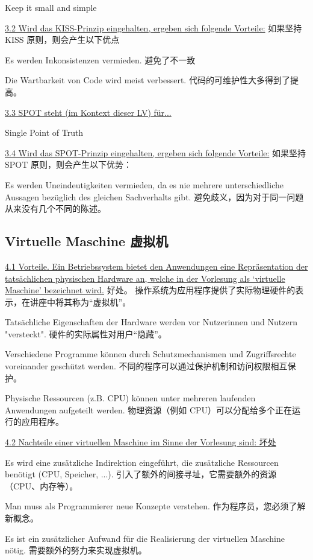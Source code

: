 \documentclass[fleqn]{article}
\begin{document}
Keep it small and simple

\noindent\uline{3.2 Wird das KISS-Prinzip eingehalten, ergeben sich folgende Vorteile:}
如果坚持 KISS 原则，则会产生以下优点

Es werden Inkonsistenzen vermieden.
避免了不一致

Die Wartbarkeit von Code wird meist verbessert. 代码的可维护性大多得到了提高。

\noindent\uline{3.3 SPOT steht (im Kontext dieser LV) für...}

Single Point of Truth

\noindent\uline{3.4 Wird das SPOT-Prinzip eingehalten, ergeben sich folgende Vorteile:}
如果坚持 SPOT 原则，则会产生以下优势：

Es werden Uneindeutigkeiten vermieden, da es nie mehrere unterschiedliche Aussagen bezüglich des gleichen Sachverhalts gibt.
避免歧义，因为对于同一问题从来没有几个不同的陈述。

\subsection{Virtuelle Maschine 虚拟机}

\noindent\uline{4.1 Vorteile. Ein Betriebssystem bietet den Anwendungen eine Repräsentation der tatsächlichen physischen Hardware an, welche in der Vorlesung als ‘virtuelle Maschine’ bezeichnet wird.}
好处。 操作系统为应用程序提供了实际物理硬件的表示，在讲座中将其称为“虚拟机”。

Tatsächliche Eigenschaften der Hardware werden vor Nutzerinnen und Nutzern "versteckt".
硬件的实际属性对用户“隐藏”。
	
Verschiedene Programme können durch Schutzmechanismen und Zugriffsrechte voreinander geschützt werden.
不同的程序可以通过保护机制和访问权限相互保护。
	
Physische Ressourcen (z.B. CPU) können unter mehreren laufenden Anwendungen aufgeteilt werden.
物理资源（例如 CPU）可以分配给多个正在运行的应用程序。

\noindent\uline{4.2 Nachteile einer virtuellen Maschine im Sinne der Vorlesung sind: 坏处}

Es wird eine zusätzliche Indirektion eingeführt, die zusätzliche Ressourcen benötigt (CPU, Speicher, ...).
引入了额外的间接寻址，它需要额外的资源（CPU、内存等）。

Man muss als Programmierer neue Konzepte verstehen.
作为程序员，您必须了解新概念。

Es ist ein zusätzlicher Aufwand für die Realisierung der virtuellen Maschine nötig.
需要额外的努力来实现虚拟机。
\end{document}
